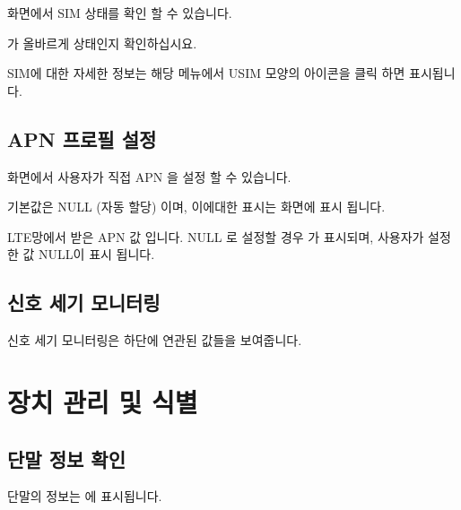 \documentclass[letterpaper,10pt,english]{sphinxmanual}
\begin{document}
\sphinxAtStartPar
{} 화면에서 SIM 상태를 확인 할 수 있습니다.

\sphinxAtStartPar
{} 가 올바르게  상태인지 확인하십시요.

\sphinxAtStartPar
SIM에 대한 자세한 정보는 해당 메뉴에서 USIM 모양의 아이콘을 클릭 하면 표시됩니다.

\noindent{}


\subsection{APN 프로필 설정}
\label{\detokenize{howto/connection:apn}}
\noindent{}

\sphinxAtStartPar
{} 화면에서 사용자가 직접 APN 을 설정 할 수 있습니다.

\sphinxAtStartPar
기본값은 NULL (자동 할당) 이며, 이에대한 표시는  화면에 표시 됩니다.

\noindent{}

\sphinxAtStartPar
{} LTE망에서 받은 APN 값 입니다. NULL 로 설정할 경우 \sphinxstylestrong{|} 가 표시되며, 사용자가 설정한 값 NULL이 표시 됩니다.


\subsection{신호 세기 모니터링}
\label{\detokenize{howto/connection:id2}}
\noindent{}

\sphinxAtStartPar
신호 세기 모니터링은  하단에 연관된 값들을 보여줍니다.

\sphinxstepscope


\section{장치 관리 및 식별}
\label{\detokenize{howto/device_manage:id1}}\label{\detokenize{howto/device_manage::doc}}

\subsection{단말 정보 확인}
\label{\detokenize{howto/device_manage:id2}}
\sphinxAtStartPar
단말의 정보는  에 표시됩니다.
\end{document}
